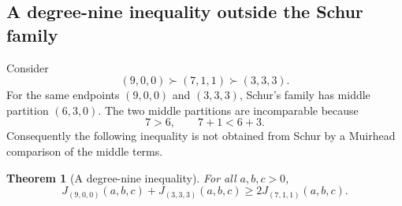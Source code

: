 \documentclass[11pt]{article}
\newtheorem{theorem}{Theorem}[section]
\theoremstyle{definition}
\begin{document}
\subsection{A degree-nine inequality outside the Schur family}

Consider
\begin{equation*}
(9,0,0)\succ(7,1,1)\succ(3,3,3).
\end{equation*}
For the same endpoints \((9,0,0)\) and \((3,3,3)\), Schur's family has middle partition \((6,3,0)\).  The two middle partitions are incomparable because
\begin{equation*}
7>6,
\qquad
7+1<6+3.
\end{equation*}
Consequently the following inequality is not obtained from Schur by a Muirhead comparison of the middle terms.

\begin{theorem}[A degree-nine inequality]\label{thm:degree-nine}
For all \(a,b,c>0\),
\begin{equation*}
J_{(9,0,0)}(a,b,c)+J_{(3,3,3)}(a,b,c)
\ge
2J_{(7,1,1)}(a,b,c).
\end{equation*}
\end{theorem}
\end{document}
